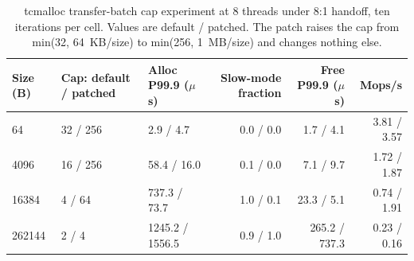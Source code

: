 \begin{table}[!htbp]
\centering
\footnotesize
\setlength{\tabcolsep}{3pt}
\caption{tcmalloc transfer-batch cap experiment at 8 threads under 8:1 handoff, ten iterations per cell. Values are default / patched. The patch raises the cap from min(32, 64~KB/size) to min(256, 1~MB/size) and changes nothing else.}
\label{tab:batchcap}
\begin{tabular}{lllrrr}
\toprule
Size (B) & Cap: default / patched & Alloc P99.9 ($\mu$s) & Slow-mode fraction & Free P99.9 ($\mu$s) & Mops/s \\
\midrule
64 & 32 / 256 & 2.9 / 4.7 & 0.0 / 0.0 & 1.7 / 4.1 & 3.81 / 3.57 \\
4096 & 16 / 256 & 58.4 / 16.0 & 0.1 / 0.0 & 7.1 / 9.7 & 1.72 / 1.87 \\
16384 & 4 / 64 & 737.3 / 73.7 & 1.0 / 0.1 & 23.3 / 5.1 & 0.74 / 1.91 \\
262144 & 2 / 4 & 1245.2 / 1556.5 & 0.9 / 1.0 & 265.2 / 737.3 & 0.23 / 0.16 \\
\bottomrule
\end{tabular}
\end{table}
